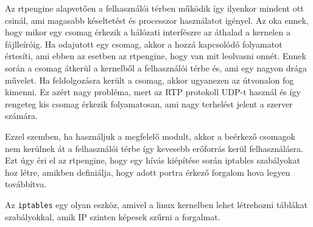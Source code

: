 Az rtpengine alapvetően a felhasználói térben működik így ilyenkor mindent ott csinál, ami
magasabb késeltetést és processzor használatot igényel. Az oka ennek, hogy mikor egy 
csomag érkezik a hálózati interfészre az áthalad a kernelen a fájlleíróig. Ha odajutott 
egy csomag, akkor a hozzá kapcsolódó folyamatot értesíti, ami ebben az esetben az 
rtpengine, hogy van mit leolvasni onnét. Ennek során a csomag átkerül a kernelből a 
felhasználói térbe és, ami egy nagyon drága művelet. Ha feldolgozásra került a csomag, 
akkor ugyanezen az útvonalon fog kimenni. Ez azért nagy probléma, mert az RTP protokoll 
UDP-t használ és így rengeteg kis csomag érkezik folyamatosan, ami nagy terhelést jelent 
a szerver számára. 

Ezzel szemben, ha használjuk a megfelelő modult, akkor a beérkező csomagok nem kerülnek 
át a felhasználói térbe így kevesebb erőforrás kerül felhasználásra. Ezt úgy éri el az 
rtpengine, hogy egy hívás kiépítése során iptables szabályokat hoz létre, 
amikben definiálja, hogy adott portra érkező forgalom hova legyen továbbítva. 

Az \texttt{iptables} egy olyan eszköz, amivel a linux kernelben lehet létrehozni 
táblákat szabályokkal, amik IP szinten képesek szűrni a forgalmat. 


